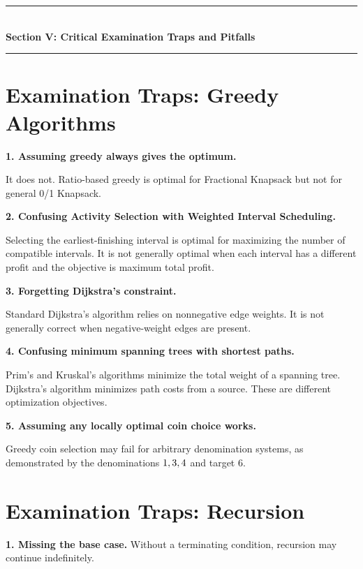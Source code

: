 \newpage
\begin{center}
\vspace{0.5em}
{\color{primary}\rule{0.45\textwidth}{1.2pt}}\\[4pt]
{\Large\bfseries\color{primary} Section V: Critical Examination Traps and Pitfalls}\\[2pt]
{\color{primary}\rule{0.45\textwidth}{1.2pt}}
\vspace{0.5em}
\end{center}


\section{Examination Traps: Greedy Algorithms}

\textbf{1. Assuming greedy always gives the optimum.}

It does not. Ratio-based greedy is optimal for Fractional Knapsack but not for general 0/1 Knapsack.

\textbf{2. Confusing Activity Selection with Weighted Interval Scheduling.}

Selecting the earliest-finishing interval is optimal for maximizing the number of compatible intervals. It is not generally optimal when each interval has a different profit and the objective is maximum total profit.

\textbf{3. Forgetting Dijkstra's constraint.}

Standard Dijkstra's algorithm relies on nonnegative edge weights. It is not generally correct when negative-weight edges are present.

\textbf{4. Confusing minimum spanning trees with shortest paths.}

Prim's and Kruskal's algorithms minimize the total weight of a spanning tree. Dijkstra's algorithm minimizes path costs from a source. These are different optimization objectives.

\textbf{5. Assuming any locally optimal coin choice works.}

Greedy coin selection may fail for arbitrary denomination systems, as demonstrated by the denominations $\\{1,3,4\\}$ and target 6.

\section{Examination Traps: Recursion}

\textbf{1. Missing the base case.} Without a terminating condition, recursion may continue indefinitely.

